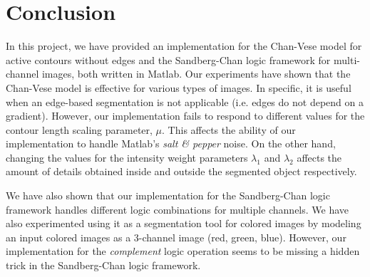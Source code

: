 \documentclass[10pt,twocolumn,letterpaper]{article}
\begin{document}
\section{Conclusion}
\label{sec:concl}
In this project, we have provided an implementation for the Chan-Vese model for active contours without edges and the Sandberg-Chan logic framework for
multi-channel images, both written in Matlab. Our experiments have shown that the Chan-Vese model is effective for various types of images. In specific, it is
useful when an edge-based segmentation is not applicable (i.e. edges do not depend on a gradient). However, our implementation fails to respond to different
values for the contour length scaling parameter, $\mu$. This affects the ability of our implementation to handle Matlab's \textit{salt \& pepper} noise. On the
other hand, changing the values for the intensity weight parameters $\lambda_1$ and $\lambda_2$ affects the amount of details obtained inside and outside the
segmented object respectively.

We have also shown that our implementation for the Sandberg-Chan logic framework handles different logic combinations for multiple channels. We have also
experimented using it as a segmentation tool for colored images by modeling an input colored images as a 3-channel image (red, green, blue). However, our
implementation for the \textit{complement} logic operation seems to be missing a hidden trick in the Sandberg-Chan logic framework.






\end{document}
